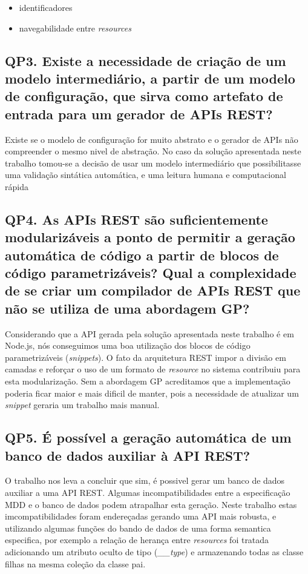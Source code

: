 \begin{itemize}
	\item identificadores
	\item navegabilidade entre \textit{resources}
\end{itemize}

\subsection{QP3. Existe a necessidade de criação de um modelo intermediário, a partir de um modelo de configuração, que sirva como artefato de entrada para um gerador de APIs REST?}

Existe se o modelo de configuração for muito abstrato e o gerador de APIs não compreender o mesmo nivel de abstração. No caso da solução apresentada neste trabalho tomou-se a decisão de usar um modelo intermediário que possibilitasse uma validação sintática automática, e uma leitura humana e computacional rápida

\subsection{QP4. As APIs REST são suficientemente modularizáveis a ponto de permitir a geração automática de código a partir de blocos de código parametrizáveis? Qual a complexidade de se criar um compilador de APIs REST que não se utiliza de uma abordagem GP?}

Considerando que a API gerada pela solução apresentada neste trabalho é em Node.js, nós conseguimos uma boa utilização dos blocos de código parametrizáveis (\textit{snippets}). O fato da arquitetura REST impor a divisão em camadas e reforçar o uso de um formato de \textit{resource} no sistema contribuiu para esta modularização. Sem a abordagem GP acreditamos que a implementação poderia ficar maior e mais dificil de manter, pois a necessidade de atualizar um \textit{snippet} geraria um trabalho mais manual.

\subsection{QP5. É possível a geração automática de um banco de dados auxiliar à API REST?}

O trabalho nos leva a concluir que sim, é possivel gerar um banco de dados auxiliar a uma API REST. Algumas incompatibilidades entre a especificação MDD e o banco de dados podem atrapalhar esta geração. Neste trabalho estas imcompatibilidades foram endereçadas gerando uma API mais robusta, e utilizando algumas funções do bando de dados de uma forma semantica especifica, por exemplo a relação de herança entre \textit{resources} foi tratada adicionando um atributo oculto de tipo (\textit{__type}) e armazenando todas as classe filhas na mesma coleção da classe pai.


